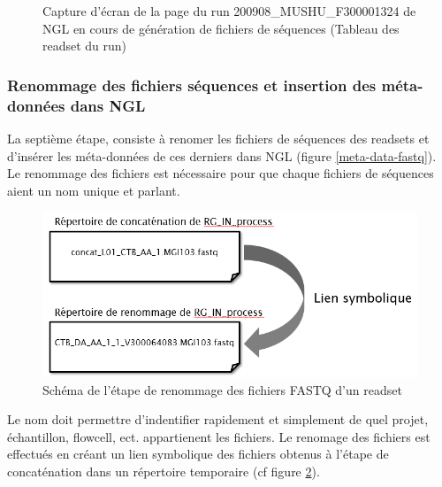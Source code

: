 \begin{figure}[H]
    \centering
    \caption{\footnotesize{Capture d'écran de la page du run 200908\_MUSHU\_F300001324 de NGL en cours de génération de fichiers de séquences (Tableau des readset du run)}}
    \label{NGL-screenshot_tab-run-readset}
\end{figure}

\subsubsection*{Renommage des fichiers séquences et insertion des méta-données dans NGL}
La septième étape, consiste à renomer les fichiers de séquences des readsets et d'insérer les méta-données de ces derniers dans NGL (figure \ref{meta-data-fastq}).
Le renommage des fichiers est nécessaire pour que chaque fichiers de séquences aient un nom unique et \og parlant\fg{}.\\

\begin{minipage}{0.45\textwidth}
    \begin{figure}[H]
        \centering
        \includegraphics[width=1\textwidth]{img/Schema-renomage-fastq.png}
        \caption{\footnotesize{Schéma de l'étape de renommage des fichiers FASTQ d'un readset}}
        \label{schema-rename-fastq}
    \end{figure}
\end{minipage}
\hfill
\begin{minipage}{0.45\textwidth}
    Le nom doit permettre d'indentifier rapidement et simplement de quel projet, échantillon, flowcell, ect.
    appartienent les fichiers.
    Le renomage des fichiers est effectués en créant un lien symbolique des fichiers obtenus à l'étape de \og concaténation\fg{} dans un répertoire temporaire (cf figure \ref{schema-rename-fastq}).
\end{minipage}\\\\

